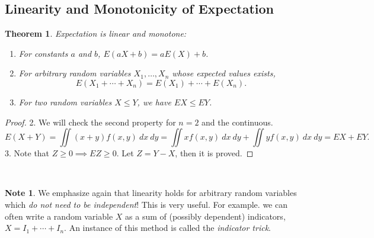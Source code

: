 \documentclass[12pt,a4paper]{article}
\newtheorem{theorem}{Theorem}[section]
\theoremstyle{definition}
\theoremstyle{definition}
\theoremstyle{definition}
\theoremstyle{definition}
\theoremstyle{remark}
\theoremstyle{definition}
\newtheorem*{note}{Note}
\begin{document}
\subsection{Linearity and Monotonicity of Expectation}
\begin{tcolorbox}[colback=white]
	\begin{theorem}
		Expectation is linear and monotone:\begin{enumerate}
			\item For constants $a$ and $b$, $E(aX+b)=aE(X)+b$.
			\item For arbitrary random variables $X_1,\dots, X_n$ whose expected values exists, \[
			E(X_1+\cdots+X_n)=E(X_1)+\cdots+E(X_n).
			\]
			\item For two random variables $X\leq Y$, we have $EX\leq EY$.
		\end{enumerate}
	\end{theorem}\tcblower\begin{proof}
	2. We will check the second property for $n=2$ and the continuous. \[
	E(X+Y)=\iint(x+y)f(x,y)\ dx\ dy=\iint x f(x,y)\ dx\ dy+\iint yf(x,y)\ dx\ dy=EX+EY.
	\] 3. Note that $Z\geq 0\implies EZ\geq 0$. Let $Z=Y-X$, then it is proved.
\end{proof}
\end{tcolorbox}
\
\begin{note}
	We emphasize again that linearity holds for arbitrary random variables which \textit{do not need to be independent}! This is very useful. For example. we can often write a random variable $X$ as a sum of (possibly dependent) indicators, $X=I_1+\cdots+I_n$. An instance of this method is called the \textit{indicator trick}.
\end{note}
\newpage
\end{document}
